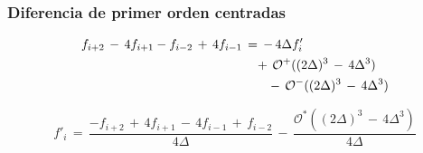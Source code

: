 \documentclass[9pt,technote,twoside,letterpaper,twocolumn]{IEEEtran}
\begin{document}
\subsubsection{Diferencia de primer orden centradas}
\label{sec:dif1D2Oc}
\begin{align}
  f_{i+2}\,-\,4f_{i+1}-f_{i-2}\,+\,4f_{i-1}&\,=\,-\,4\Delta f'_i\notag\\
  &\quad+\,\mathcal{O}^+((2\Delta)^3\,-\,4\Delta^3)\notag\\
  &\qquad-\,\mathcal{O}^-((2\Delta)^3\,-\,4\Delta^3)\notag
\end{align}

\begin{equation}
  f'_i\,=\,\frac{-f_{i+2}\,+\,4f_{i+1}\,-\,4f_{i-1}\,+\,f_{i-2}}{4\Delta}\,-\,\frac{\mathcal{O}^*((2\Delta)^3\,-\,4\Delta^3)}{4\Delta}
  \label{eq:2ordC}
\end{equation}
\end{document}
